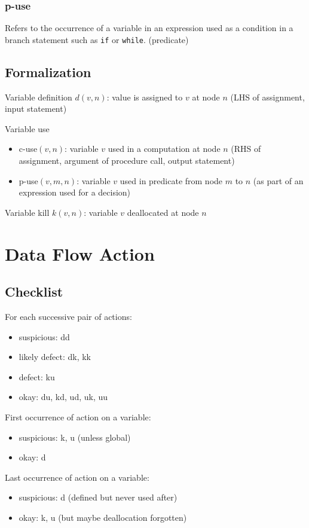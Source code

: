 \documentclass[11pt]{article}
\begin{document}
\subsubsection{p-use}
\label{sec:org5af8e97}
Refers to the occurrence of a variable in an expression used as a condition
in a branch statement such as \texttt{if} or \texttt{while}. (predicate)
\subsection{Formalization}
\label{sec:orgfba7810}
Variable definition \(d(v, n)\): value is assigned to \(v\) at node \(n\)
(LHS of assignment, input statement)

Variable use
\begin{itemize}
\item c-use\((v, n)\): variable \(v\) used in a computation at node \(n\)
(RHS of assignment, argument of procedure call, output statement)
\item p-use\((v, m, n)\): variable \(v\) used in predicate from node \(m\) to \(n\)
(as part of an expression used for a decision)
\end{itemize}

Variable kill \(k(v, n)\): variable \(v\) deallocated at node \(n\)
\section{Data Flow Action}
\label{sec:org71c4f89}
\subsection{Checklist}
\label{sec:org900ccad}
For each successive pair of actions:
\begin{itemize}
\item suspicious: dd
\item likely defect: dk, kk
\item defect: ku
\item okay: du, kd, ud, uk, uu
\end{itemize}

First occurrence of action on a variable:
\begin{itemize}
\item suspicious: k, u (unless global)
\item okay: d
\end{itemize}

Last occurrence of action on a variable:
\begin{itemize}
\item suspicious: d (defined but never used after)
\item okay: k, u (but maybe deallocation forgotten)
\end{itemize}
\end{document}

